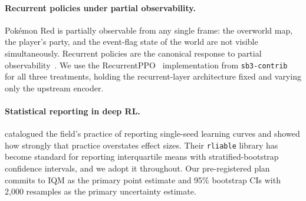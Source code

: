 \paragraph{Recurrent policies under partial observability.}
Pok\'emon Red is partially observable from any single frame: the
overworld map, the player's party, and the event-flag state of the
world are not visible simultaneously.  Recurrent policies are the
canonical response to partial
observability~\citep{hausknecht2015drqn}.  We use the
RecurrentPPO~\citep{schulman2017ppo} implementation from
\texttt{sb3-contrib}~\citep{sb3} for all three treatments, holding the
recurrent-layer architecture fixed and varying only the upstream
encoder.

\paragraph{Statistical reporting in deep RL.}
\citet{agarwal2021rliable} catalogued the field's practice of reporting
single-seed learning curves and showed how strongly that practice
overstates effect sizes.  Their \texttt{rliable} library has become
standard for reporting interquartile means with stratified-bootstrap
confidence intervals, and we adopt it throughout.  Our pre-registered
plan commits to IQM as the primary point estimate and 95\% bootstrap
CIs with 2,000 resamples as the primary uncertainty estimate.
